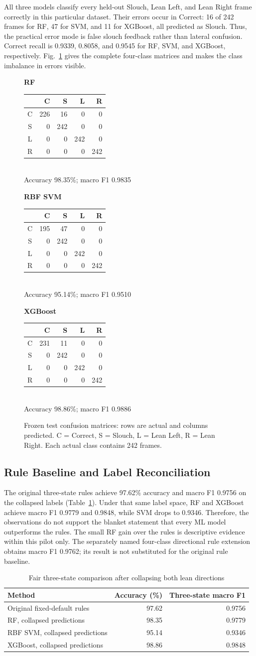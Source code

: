\documentclass[conference]{IEEEtran}
\newcommand{\smalltable}{\setlength{\tabcolsep}{3.5pt}\renewcommand{\arraystretch}{1.12}\footnotesize}
\begin{document}
All three models classify every held-out Slouch, Lean Left, and Lean Right frame correctly in this particular dataset. Their errors occur in Correct: 16 of 242 frames for RF, 47 for SVM, and 11 for XGBoost, all predicted as Slouch. Thus, the practical error mode is false slouch feedback rather than lateral confusion. Correct recall is 0.9339, 0.8058, and 0.9545 for RF, SVM, and XGBoost, respectively. Fig.~\ref{fig:confusion} gives the complete four-class matrices and makes the class imbalance in errors visible.

\begin{figure}[t]\centering
\newcommand{\cmatrix}[5]{\begin{minipage}{.31\textwidth}\centering\footnotesize\textbf{#1}\\[2pt]\begin{tabular}{c|rrrr}&C&S&L&R\\\hline C&#2&#3&0&0\\S&0&242&0&0\\L&0&0&242&0\\R&0&0&0&242\end{tabular}\\[3pt]Accuracy #4\%; macro F1 #5\end{minipage}}
\cmatrix{RF}{226}{16}{98.35}{0.9835}\hfill
\cmatrix{RBF SVM}{195}{47}{95.14}{0.9510}\hfill
\cmatrix{XGBoost}{231}{11}{98.86}{0.9886}
\caption{Frozen test confusion matrices: rows are actual and columns predicted. C = Correct, S = Slouch, L = Lean Left, R = Lean Right. Each actual class contains 242 frames.}
\label{fig:confusion}\end{figure}

\subsection{Rule Baseline and Label Reconciliation}
The original three-state rules achieve 97.62\% accuracy and macro F1 0.9756 on the collapsed labels (Table~\ref{tab:baseline}). Under that same label space, RF and XGBoost achieve macro F1 0.9779 and 0.9848, while SVM drops to 0.9346. Therefore, the observations do not support the blanket statement that every ML model outperforms the rules. The small RF gain over the rules is descriptive evidence within this pilot only. The separately named four-class directional rule extension obtains macro F1 0.9762; its result is not substituted for the original rule baseline.

\begin{table}[t]\caption{Fair three-state comparison after collapsing both lean directions}\label{tab:baseline}\centering\smalltable
\begin{tabular}{lrr}\toprule Method & Accuracy (\%) & Three-state macro F1\\\midrule
Original fixed-default rules & 97.62 & 0.9756\\
RF, collapsed predictions & 98.35 & 0.9779\\
RBF SVM, collapsed predictions & 95.14 & 0.9346\\
XGBoost, collapsed predictions & 98.86 & 0.9848\\\bottomrule
\end{tabular}\end{table}
\end{document}
